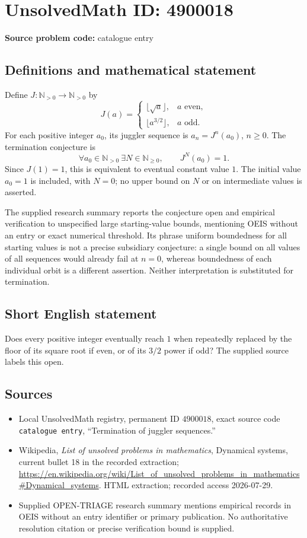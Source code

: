\documentclass[11pt]{article}
\newcommand{\N}{\mathbb{N}}
\begin{document}
\section*{UnsolvedMath ID: 4900018}
\textbf{Source problem code:} catalogue entry
\subsection{Definitions and mathematical statement}
Define \(J:\N_{>0}\to\N_{>0}\) by
\[
J(a)=\begin{cases}
\lfloor\sqrt a\rfloor,&a\text{ even},\\
\lfloor a^{3/2}\rfloor,&a\text{ odd}.
\end{cases}
\]
For each positive integer \(a_0\), its juggler sequence is \(a_n=J^n(a_0)\), \(n\ge0\). The termination conjecture is
\[
\forall a_0\in\N_{>0}\ \exists N\in\N_{\ge0},\qquad J^N(a_0)=1.
\]
Since \(J(1)=1\), this is equivalent to eventual constant value \(1\). The initial value \(a_0=1\) is included, with \(N=0\); no upper bound on \(N\) or on intermediate values is asserted.

The supplied research summary reports the conjecture open and empirical verification to unspecified large starting-value bounds, mentioning OEIS without an entry or exact numerical threshold. Its phrase uniform boundedness for all starting values is not a precise subsidiary conjecture: a single bound on all values of all sequences would already fail at \(n=0\), whereas boundedness of each individual orbit is a different assertion. Neither interpretation is substituted for termination.
\subsection{Short English statement}
Does every positive integer eventually reach \(1\) when repeatedly replaced by the floor of its square root if even, or of its \(3/2\) power if odd? The supplied source labels this open.
\subsection{Sources}
\begin{itemize}
\item Local UnsolvedMath registry, permanent ID \(4900018\), exact source code \texttt{catalogue entry}, ``Termination of juggler sequences.''
\item Wikipedia, \emph{List of unsolved problems in mathematics}, Dynamical systems, current bullet 18 in the recorded extraction; \url{https://en.wikipedia.org/wiki/List_of_unsolved_problems_in_mathematics#Dynamical_systems}. HTML extraction; recorded access 2026-07-29.
\item Supplied OPEN-TRIAGE research summary mentions empirical records in OEIS without an entry identifier or primary publication. No authoritative resolution citation or precise verification bound is supplied.
\end{itemize}
\end{document}
